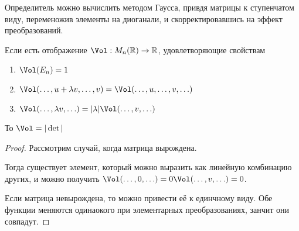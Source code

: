 Определитель можно вычислить методом Гаусса, привдя матрицы к ступенчатом виду, переменожив элементы на диоганали, и скорректировавшись на эффект преобразований.
\begin{theorem} \thmslashn

    Если есть отображение $\Vol : M_{n}(\mathbb{R}) \to \mathbb{R}$, удовлетворяющие свойствам
    \begin{enumerate}
        \item $\Vol(E_{n}) = 1$ 
        \item $\Vol(\ldots, u + \lambda v, \ldots, v) = \Vol(\ldots, u, \ldots, v, \ldots)$
        \item $\Vol (\ldots, \lambda v, \ldots) =  |\lambda|\Vol(\ldots, v, \ldots)$
    \end{enumerate}
    То $\Vol = |\det|$
    \begin{proof} \thmslashn
    
        Рассмотрим случай, когда матрица вырождена.

        Тогда существует элемент, который можно выразить как линейную комбинацию других, и можно получить $\Vol(\ldots, 0, \ldots) = 0 \Vol(\ldots, v, \ldots) = 0$.

        Если матрица невырождена, то можно привести её к единчному виду. Обе функции меняются одинаокого при элементарных преобразованиях, занчит они совпадут.
    \end{proof}
\end{theorem}
